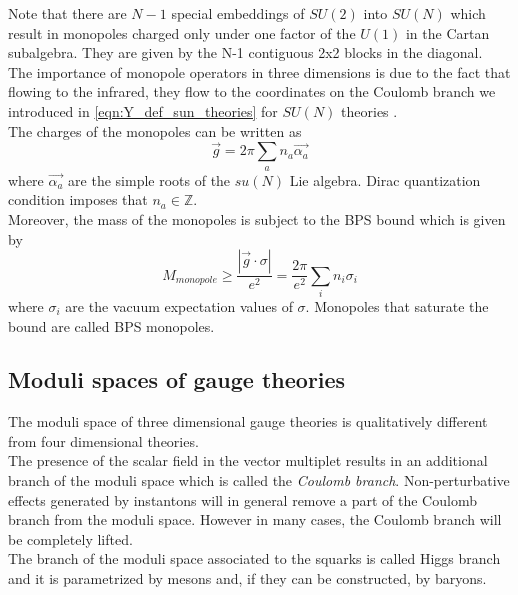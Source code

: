 Note that there are $N-1$ special embeddings of $SU(2)$ into $SU(N)$ which result in monopoles charged only under one factor of the $U(1)$ in the Cartan subalgebra. They are given by the N-1 contiguous 2x2 blocks in the diagonal.\\
The importance of monopole operators in three dimensions is due to the fact that flowing to the infrared, they flow to the coordinates on the Coulomb branch we introduced in \eqref{eqn:Y_def_sun_theories} for $SU(N)$ theories \cite{Aharony:2013dha}.
\\
The charges of the monopoles can be written as
\begin{equation}
\vec{g}  = 2 \pi \sum_a n_a \vec{\alpha_a}
\end{equation}
where $\vec{\alpha_a}$ are the simple roots of the $su(N)$ Lie algebra. Dirac quantization condition imposes that $n_a \in \mathbb{Z}$.\\
Moreover, the mass of the monopoles is subject to the BPS bound which is given by
\begin{equation}
M_{monopole} \geq \frac{| \vec{g} \cdot \sigma| }{e^2} = \frac{2 \pi}{e^2} \sum_i n_i \sigma_i
\end{equation}
where $\sigma_i$ are the vacuum expectation values of $\sigma$.
Monopoles that saturate the bound are called BPS monopoles.\\

 























 \subsection{Moduli spaces of gauge theories}


The moduli space of three dimensional gauge theories is qualitatively different from four dimensional theories.\\
The presence of the scalar field in the vector multiplet results in an additional branch of the moduli space which is called the \emph{Coulomb branch}.
Non-perturbative effects generated by instantons will in general remove a part of the Coulomb branch from the moduli space. 
However in many cases, the Coulomb branch will be completely lifted.\\
The branch of the moduli space associated to the squarks is called Higgs branch and it is parametrized by mesons and, if they can be constructed, by baryons.








